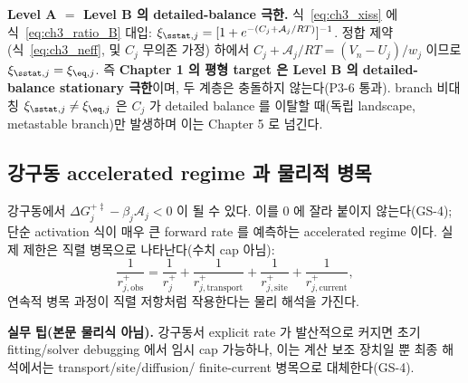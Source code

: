 \begin{verifybox}
\textbf{Level A $=$ Level B 의 detailed-balance 극한.} 식~\eqref{eq:ch3_xiss} 에 식~\eqref{eq:ch3_ratio_B}
대입: $\xi_{\sstat,j}=[1+e^{-(C_j+\mathcal A_j/RT)}]^{-1}$. 정합 제약(식~\eqref{eq:ch3_neff}, 및 $C_j$ 무의존
가정) 하에서 $C_j+\mathcal A_j/RT=(V_n-U_j)/w_j$ 이므로 $\xi_{\sstat,j}=\xi_{\eq,j}$. 즉 \textbf{Chapter 1 의 평형 target
은 Level B 의 detailed-balance stationary 극한}이며, 두 계층은 충돌하지 않는다(P3-6 통과). branch 비대칭
$\xi_{\sstat,j}\ne\xi_{\eq,j}$ 은 $C_j$ 가 detailed balance 를 이탈할 때(독립 landscape, metastable branch)만
발생하며 이는 Chapter 5 로 넘긴다.
\end{verifybox}

\subsection{강구동 accelerated regime 과 물리적 병목}
강구동에서 $\Delta G_j^{+\ddagger}-\beta_j\mathcal A_j<0$ 이 될 수 있다. 이를 0 에 잘라 붙이지 않는다(GS-4);
단순 activation 식이 매우 큰 forward rate 를 예측하는 accelerated regime 이다. 실제 제한은 직렬 병목으로
나타난다(수치 cap 아님):
\begin{equation}
\frac{1}{r_{j,\mathrm{obs}}^+}=\frac{1}{r_j^+}+\frac{1}{r_{j,\mathrm{transport}}^+}+\frac{1}{r_{j,\mathrm{site}}^+}+\frac{1}{r_{j,\mathrm{current}}^+},
\label{eq:ch3_forward_limiter}
\end{equation}
연속적 병목 과정이 직렬 저항처럼 작용한다는 물리 해석을 가진다.
\begin{mdframed}
\textbf{실무 팁(본문 물리식 아님).} 강구동서 explicit rate 가 발산적으로 커지면 초기 fitting/solver
debugging 에서 임시 cap 가능하나, 이는 계산 보조 장치일 뿐 최종 해석에서는 transport/site/diffusion/
finite-current 병목으로 대체한다(GS-4).
\end{mdframed}


